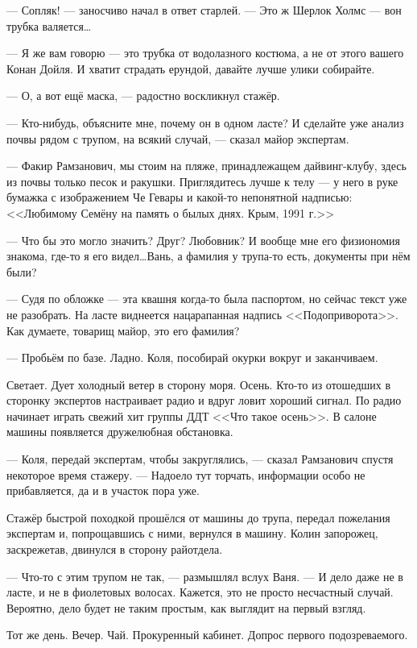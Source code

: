 --- Сопляк! --- заносчиво начал в ответ старлей. --- Это ж Шерлок Холмс --- вон трубка валяется\ldots

--- Я же вам говорю --- это трубка от водолазного костюма, а не от этого вашего Конан Дойля. И хватит страдать ерундой, давайте лучше улики собирайте.

--- О, а вот ещё маска, --- радостно воскликнул стажёр.

--- Кто-нибудь, объясните мне, почему он в одном ласте? И сделайте уже анализ почвы рядом с трупом, на всякий случай, --- сказал майор экспертам.

--- Факир Рамзанович, мы стоим на пляже, принадлежащем дайвинг-клубу, здесь из почвы только песок и ракушки. Приглядитесь лучше к телу --- у него в руке бумажка с изображением Че Гевары и какой-то непонятной надписью: <<Любимому Семёну на память о былых днях. Крым, 1991 г.>>

--- Что бы это могло значить? Друг? Любовник? И вообще мне его физиономия знакома, где-то я его видел\ldots Вань, а фамилия у трупа-то есть, документы при нём были?

--- Судя по обложке --- эта квашня когда-то была паспортом, но сейчас текст уже не разобрать. На ласте виднеется нацарапанная надпись <<Подоприворота>>. Как думаете, товарищ майор, это его фамилия?

--- Пробьём по базе. Ладно. Коля, пособирай окурки вокруг и заканчиваем.

Светает. Дует холодный ветер в сторону моря. Осень. Кто-то из отошедших в сторонку экспертов настраивает радио и вдруг ловит хороший сигнал. По радио начинает играть свежий хит группы ДДТ <<Что такое осень>>. В салоне машины появляется дружелюбная обстановка.

--- Коля, передай экспертам, чтобы закруглялись, --- сказал Рамзанович спустя некоторое время стажеру. --- Надоело тут торчать, информации особо не прибавляется, да и в участок пора уже.

Стажёр быстрой походкой прошёлся от машины до трупа, передал пожелания экспертам и, попрощавшись с ними, вернулся в машину. Колин запорожец, заскрежетав, двинулся в сторону райотдела.

--- Что-то с этим трупом не так, --- размышлял вслух Ваня. --- И дело даже не в ласте, и не в фиолетовых волосах. Кажется, это не просто несчастный случай. Вероятно, дело будет не таким простым, как выглядит на первый взгляд.

\asterisks

Тот же день. Вечер. Чай. Прокуренный кабинет. Допрос первого подозреваемого.


